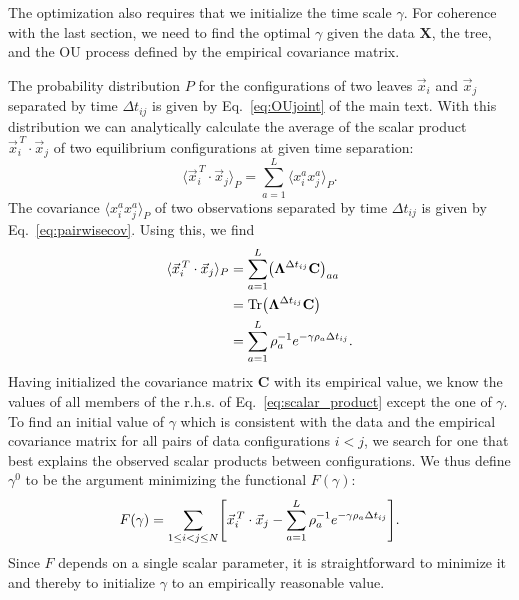 \documentclass[preprint,amsmath,amssymb,superscriptaddress,showpacs,pre]{revtex4-1}
\let\originalleft\left
\let\originalright\right
\renewcommand{\left}{\mathopen{}\mathclose\bgroup\originalleft}
\renewcommand{\right}{\aftergroup\egroup\originalright}
\def\vx{\vec x}
\DeclareMathOperator{\Tr}{Tr}
\newcommand{\ddroit}{\textrm{d}}
\newcommand{\Lam}{\bm{\Lambda}}
\begin{document}
The optimization also requires that we initialize the time scale $\gamma$. For coherence with the last section, we need to find the optimal $\gamma$ given the data $\mathbf{X}$, the tree, and the OU process defined by the empirical covariance matrix. 

The probability distribution $P$ for the configurations of two leaves $\vx_i$ and  $\vx_j$  separated by time $\Delta t_{ij}$ is given by Eq.~\eqref{eq:OUjoint} of the main text. With this distribution we can analytically calculate the average of the scalar product $\vx_i^{\,T}\cdot\vx_j$ of two equilibrium configurations at given time separation:
\begin{equation}
	\langle \vx_i^{\,T}\cdot\vx_j \rangle_P = \sum_{a=1}^L \langle  x_i^{a} x_j^a \rangle_{P}.
\end{equation}
The covariance $\langle  x_i^{a} x_j^a \rangle_{P}$ of two observations separated by time $\Delta t_{ij}$ is given by Eq.~\eqref{eq:pairwisecov}. Using this, we find
\begin{align}
		\nonumber\langle \vx_i^{\,T}\cdot\vx_j \rangle_P &= \sum_{a=1}^L \left( \Lam^{\Delta t_{ij}} \mathbf{C} \right)_{aa}\\
		\nonumber&= \Tr\left( \Lam^{\Delta t_{ij}} \mathbf{C} \right)\\
		&= \sum_{a=1}^L \rho_a^{-1}e^{-\gamma\rho_a\Delta t_{ij}}.
		\label{eq:scalar_product}
\end{align}
Having initialized the covariance matrix $\mathbf{C}$ with its empirical value, we know the values of all members of the r.h.s. of Eq.~\eqref{eq:scalar_product} except the one of $\gamma$. To find an initial value of $\gamma$ which is consistent with the data and the empirical covariance matrix for all pairs of data configurations $i<j$, we search for one that best explains the observed scalar products between configurations. We thus define $\gamma^0$ to be the argument minimizing the functional $F(\gamma)$: 
\begin{equation}
    F(\gamma) = \sum_{1\leq i<j\leq N}\left[ \vx_i^{\,T}\cdot\vx_j - \sum_{a=1}^L \rho_a^{-1}e^{-\gamma\rho_a\Delta t_{ij}} \right].
\end{equation} 
Since $F$ depends on a single scalar parameter, it is straightforward to minimize it and thereby to initialize $\gamma$ to an empirically reasonable value.
\end{document}
